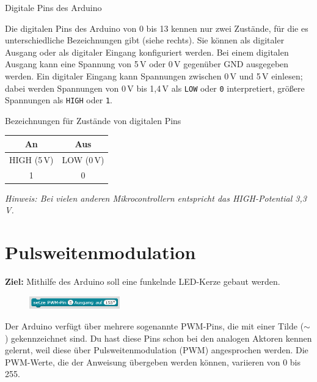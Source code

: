 \bigskip
\begin{zsfg}{Digitale Pins des Arduino}
	\begin{minipage}{0.6\textwidth}
			Die digitalen Pins des Arduino von 0 bis 13 kennen nur zwei Zustände, für die es unterschiedliche Bezeichnungen gibt (siehe rechts). Sie können als digitaler Ausgang oder als digitaler Eingang konfiguriert werden. Bei einem digitalen Ausgang kann eine Spannung von 5\,V oder 0\,V gegenüber GND ausgegeben werden. Ein digitaler Eingang kann Spannungen zwischen 0\,V und 5\,V einlesen; dabei werden Spannungen von 0\,V bis 1,4\,V als \texttt{LOW} oder \texttt{0} interpretiert, größere Spannungen als \texttt{HIGH} oder \texttt{1}.
	\end{minipage}
	\hfill
	\begin{minipage}{0.35\textwidth}
		Bezeichnungen für Zustände von digitalen Pins
		
		\medskip
		\begin{center}
			\begin{tabular}{c|c} \hline
				An & Aus \\ \hline
				HIGH (5\,V) & LOW (0\,V) \\ \hline
				1 & 0 \\ \hline
			\end{tabular}
		\end{center}
		
		\medskip
		\scriptsize \emph{Hinweis: Bei vielen anderen Mikrocontrollern entspricht das HIGH-Potential 3,3\,V.}
	\end{minipage}
\end{zsfg}


\newpage
\section{Pulsweitenmodulation}
\label{sec:pwm}

\begin{ziel}
	\textbf{Ziel:} Mithilfe des Arduino soll eine funkelnde LED-Kerze gebaut werden.
\end{ziel}

\begin{figure}
	\centering
	\includegraphics[width=0.35\textwidth]{./pics/analogwrite.png}
\end{figure}
Der Arduino verfügt über mehrere sogenannte PWM-Pins, die mit einer Tilde ($\sim$) gekennzeichnet sind. Du hast diese Pins schon bei den analogen Aktoren kennen gelernt, weil diese über Pulsweitenmodulation (PWM) angesprochen werden. Die PWM-Werte, die der Anweisung übergeben werden können, variieren von 0 bis 255.

